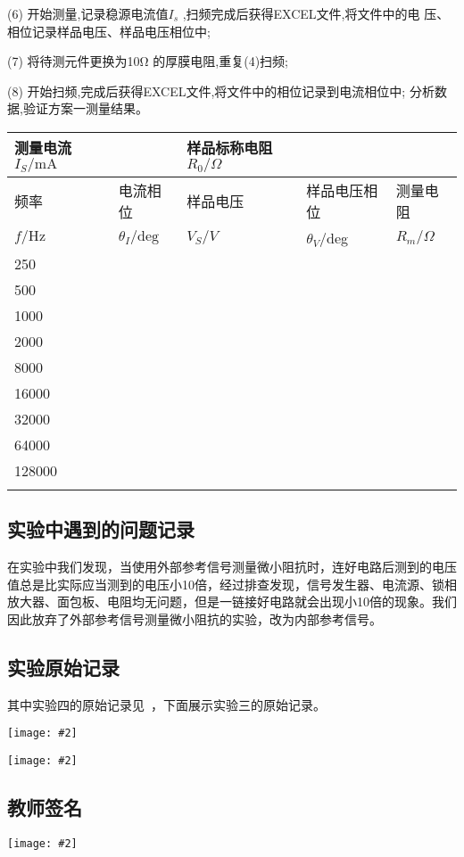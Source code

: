 \documentclass[11pt,a4paper]{ctexart}
\newcommand{\cpic}[2]{
\begin{center}
\texttt{[image: \#2]}
\end{center}
}
\begin{document}
(6) 开始测量,记录稳源电流值$I_s$ ,扫频完成后获得EXCEL文件,将文件中的电
压、相位记录样品电压、样品电压相位中;

(7) 将待测元件更换为10Ω 的厚膜电阻,重复(4)扫频;

(8) 开始扫频,完成后获得EXCEL文件,将文件中的相位记录到电流相位中;
分析数据,验证方案一测量结果。

\begin{tabular}{|l|l|l|l|l|}
\hline
测量电流$I_S/\mathrm{mA}$ &      & 样品标称电阻$R_0/\Omega$ &        &      \\ \hline
频率   & 电流相位 & 样品电压& 样品电压相位 & 测量电阻 \\
$f/\mathrm{Hz}$&$\theta_I/\mathrm{deg}$&$V_S/V$&$\theta_V$/deg &$R_m/\Omega$ \\\hline
250 &      &        &        &      \\\hline
500 &      &        &        &      \\\hline
1000 &      &        &        &      \\\hline
2000 &      &        &        &      \\\hline
8000&      &        &        &      \\\hline
16000 &      &        &        &      \\\hline
32000 &      &        &        &      \\\hline
64000 &      &        &        &      \\\hline
128000&      &        &        &      \\\hline
&      &        &        &      \\\hline
\end{tabular}
\subsection{实验中遇到的问题记录}
在实验中我们发现，当使用外部参考信号测量微小阻抗时，连好电路后测到的电压值总是比实际应当测到的电压小10倍，经过排查发现，信号发生器、电流源、锁相放大器、面包板、电阻均无问题，但是一链接好电路就会出现小10倍的现象。我们因此放弃了外部参考信号测量微小阻抗的实验，改为内部参考信号。
\subsection{实验原始记录}
其中实验四的原始记录见~\cite{github}，下面展示实验三的原始记录。
\cpic{0.4}{record_1}
\cpic{0.4}{record_2}
\subsection{教师签名}
\cpic{0.3}{sign}
\newpage
\end{document}
